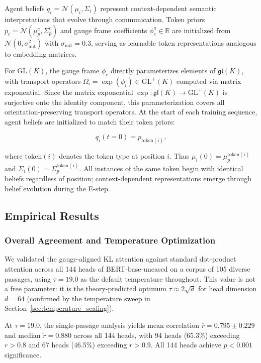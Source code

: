 \documentclass[twoside,11pt]{article}
\begin{document}
Agent beliefs $q_i = \mathcal{N}(\mu_i, \Sigma_i)$ represent context-dependent semantic interpretations that evolve through communication. Token priors $p_c = \mathcal{N}(\mu_p^c, \Sigma_p^c)$ and gauge frame coefficients $\phi_c^a \in \mathbb{R}$ are initialized from $\mathcal{N}(0, \sigma_{\text{init}}^2)$ with $\sigma_{\text{init}} = 0.3$, serving as learnable token representations analogous to embedding matrices.

For $\mathrm{GL}(K)$, the gauge frame $\phi_c$ directly parameterizes elements of $\mathfrak{gl}(K)$, with transport operators $\Omega_i = \exp(\phi_i) \in \mathrm{GL}^+(K)$ computed via matrix exponential. Since the matrix exponential $\exp: \mathfrak{gl}(K) \to \mathrm{GL}^+(K)$ is surjective onto the identity component, this parameterization covers all orientation-preserving transport operators. At the start of each training sequence, agent beliefs are initialized to match their token priors:

\begin{equation}
q_i(t=0) = p_{\text{token}(i)},
\end{equation}

where $\text{token}(i)$ denotes the token type at position $i$. Thus $\mu_i(0) = \mu_p^{\text{token}(i)}$ and $\Sigma_i(0) = \Sigma_p^{\text{token}(i)}$. All instances of the same token begin with identical beliefs regardless of position; context-dependent representations emerge through belief evolution during the E-step.

\subsection{Empirical Results}

\subsubsection{Overall Agreement and Temperature Optimization}

We validated the gauge-aligned KL attention against standard dot-product attention across all 144 heads of BERT-base-uncased on a corpus of 105 diverse passages, using $\tau = 19.0$ as the default temperature throughout. This value is not a free parameter: it is the theory-predicted optimum $\tau \approx 2\sqrt{d}$ for head dimension $d = 64$ (confirmed by the temperature sweep in Section~\ref{sec:temperature_scaling}).

At $\tau = 19.0$, the single-passage analysis yields mean correlation $\bar{r} = 0.795 \pm 0.229$ and median $\tilde{r} = 0.880$ across all 144 heads, with 94 heads (65.3\%) exceeding $r > 0.8$ and 67 heads (46.5\%) exceeding $r > 0.9$. All 144 heads achieve $p < 0.001$ significance.
\end{document}
